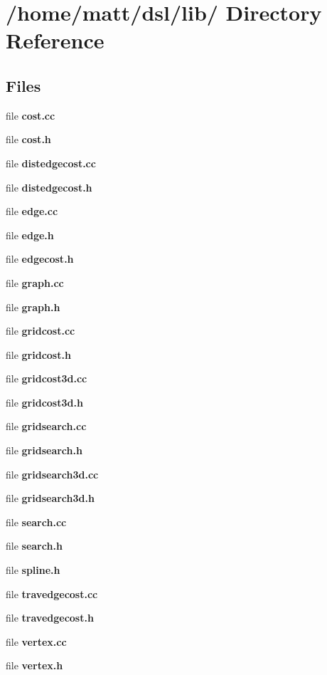 \section{/home/matt/dsl/lib/ \-Directory \-Reference}
\label{dir_9505832e787e60e1ddde1555e3d4dc98}
\subsection*{\-Files}
\begin{DoxyCompactItemize}
\item 
file {\bf cost.\-cc}
\item 
file {\bf cost.\-h}
\item 
file {\bf distedgecost.\-cc}
\item 
file {\bf distedgecost.\-h}
\item 
file {\bf edge.\-cc}
\item 
file {\bf edge.\-h}
\item 
file {\bf edgecost.\-h}
\item 
file {\bf graph.\-cc}
\item 
file {\bf graph.\-h}
\item 
file {\bf gridcost.\-cc}
\item 
file {\bf gridcost.\-h}
\item 
file {\bf gridcost3d.\-cc}
\item 
file {\bf gridcost3d.\-h}
\item 
file {\bf gridsearch.\-cc}
\item 
file {\bf gridsearch.\-h}
\item 
file {\bf gridsearch3d.\-cc}
\item 
file {\bf gridsearch3d.\-h}
\item 
file {\bf search.\-cc}
\item 
file {\bf search.\-h}
\item 
file {\bf spline.\-h}
\item 
file {\bf travedgecost.\-cc}
\item 
file {\bf travedgecost.\-h}
\item 
file {\bf vertex.\-cc}
\item 
file {\bf vertex.\-h}
\end{DoxyCompactItemize}
